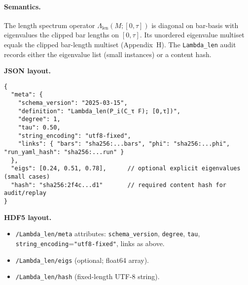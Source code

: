 \documentclass[11pt]{article}
\numberwithin{equation}{section}
\theoremstyle{plain}
\theoremstyle{definition}
\theoremstyle{remark}
\theoremstyle{plain}
\theoremstyle{definition}
\numberwithin{equation}{section}
\theoremstyle{definition}
\numberwithin{equation}{section}
\theoremstyle{plain}
\theoremstyle{definition}
\theoremstyle{remark}
\begin{document}
\paragraph{Semantics.} The length spectrum operator \(\Lambda_{\mathrm{len}}(M;[0,\tau])\) is diagonal on bar-basis with eigenvalues
the clipped bar lengths on \([0,\tau]\). Its unordered eigenvalue multiset equals the clipped bar-length multiset
(Appendix~H). The \texttt{Lambda\_len} audit records either the eigenvalue list (small instances) or a content hash.

\noindent\textbf{JSON layout.}
\begin{verbatim}
{
  "meta": {
    "schema_version": "2025-03-15",
    "definition": "Lambda_len(P_i(C_τ F); [0,τ])",
    "degree": 1,
    "tau": 0.50,
    "string_encoding": "utf8-fixed",
    "links": { "bars": "sha256:...bars", "phi": "sha256:...phi", "run_yaml_hash": "sha256:...run" }
  },
  "eigs": [0.24, 0.51, 0.78],      // optional explicit eigenvalues (small cases)
  "hash": "sha256:2f4c...d1"       // required content hash for audit/replay
}
\end{verbatim}

\noindent\textbf{HDF5 layout.}
\begin{itemize}[leftmargin=1.25em]
  \item \texttt{/Lambda\_len/meta} attributes: \texttt{schema\_version}, \texttt{degree}, \texttt{tau},
  \texttt{string\_encoding}=\texttt{"utf8-fixed"}, links as above.
  \item \texttt{/Lambda\_len/eigs} (optional; float64 array).
  \item \texttt{/Lambda\_len/hash} (fixed-length UTF-8 string).
\end{itemize}

\end{document}
